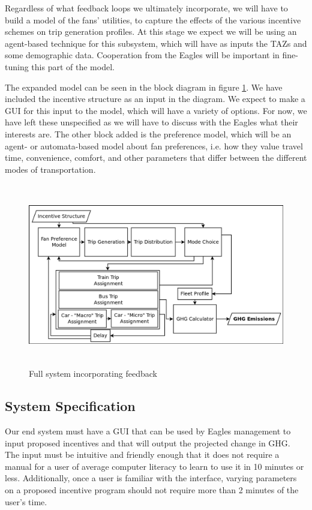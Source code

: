 Regardless of what feedback loops we ultimately incorporate, we will
have to build a model of the fans' utilities, to capture the effects
of the various incentive schemes on trip generation profiles. At this
stage we expect we will be using an agent-based technique for this
subsystem, which will have as inputs the TAZs and some demographic
data. Cooperation from the Eagles will be important in fine-tuning
this part of the model.

The expanded model can be seen in the block diagram in figure
\ref{mainsystem2}. We have included the incentive structure as an
input in the diagram. We expect to make a GUI for this input to the
model, which will have a variety of options. For now, we have left
these unspecified as we will have to discuss with the Eagles what
their interests are. The other block added is the preference model,
which will be an agent- or automata-based model about fan preferences,
i.e. how they value travel time, convenience, comfort, and other
parameters that differ between the different modes of transportation.

\begin{figure}[htp]
  \centering
  \includegraphics[height=8cm]{graphics/fullsystem2.png}
  \caption{Full system incorporating feedback}
  \label{mainsystem2}
\end{figure}

\subsection{System Specification}
Our end system must have a GUI that can be used by Eagles management
to input proposed incentives and that will output the projected change
in GHG. The input must be intuitive and friendly enough that it does
not require a manual for a user of average computer literacy to learn
to use it in 10 minutes or less. Additionally, once a user is familiar
with the interface, varying parameters on a proposed incentive program
should not require more than 2 minutes of the user's time.

